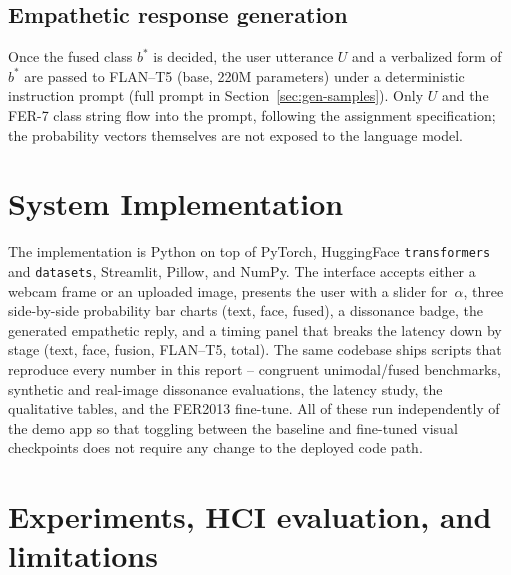 \documentclass[sigconf,nonacm]{acmart}
\begin{document}
  \subsection{Empathetic response generation}
  Once the fused class $b^{*}$ is decided, the user utterance $U$ and a verbalized form of $b^{*}$ are passed to FLAN--T5 (base, 220M parameters) under a deterministic instruction prompt (full prompt in Section~\ref{sec:gen-samples}). Only $U$ and the FER-7 class string flow into the prompt, following the assignment specification; the probability vectors themselves are not exposed to the language model.

  \section{System Implementation}\label{sec:Implementation}
  The implementation is Python on top of PyTorch, HuggingFace \texttt{transformers} and \texttt{datasets}, Streamlit, Pillow, and NumPy. The interface accepts either a webcam frame or an uploaded image, presents the user with a slider for~$\alpha$, three side-by-side probability bar charts (text, face, fused), a dissonance badge, the generated empathetic reply, and a timing panel that breaks the latency down by stage (text, face, fusion, FLAN--T5, total). The same codebase ships scripts that reproduce every number in this report -- congruent unimodal/fused benchmarks, synthetic and real-image dissonance evaluations, the latency study, the qualitative tables, and the FER2013 fine-tune. All of these run independently of the demo app so that toggling between the baseline and fine-tuned visual checkpoints does not require any change to the deployed code path.

  \section{Experiments, HCI evaluation, and limitations}
\end{document}
